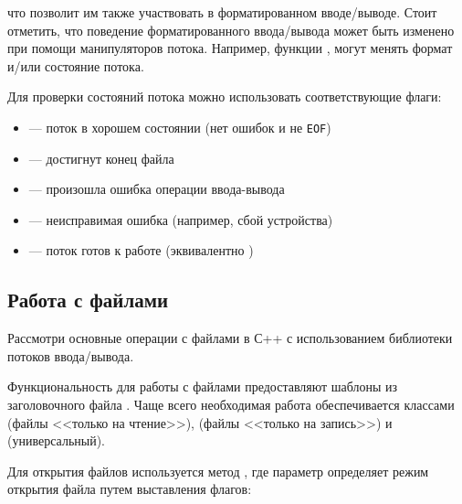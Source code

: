 что позволит им также участвовать в форматированном вводе/выводе. Стоит отметить, что поведение форматированного ввода/вывода может быть изменено
при помощи манипуляторов потока. Например, функции ,  могут менять формат и/или состояние потока.

Для проверки состояний потока можно использовать соответствующие флаги:
\begin{itemize}
    \item {} — поток в хорошем состоянии (нет ошибок и не \verb|EOF|)
    \item {} — достигнут конец файла
    \item {} — произошла ошибка операции ввода-вывода
    \item {} — неисправимая ошибка (например, сбой устройства)
    \item {} — поток готов к работе (эквивалентно )
\end{itemize}

\subsection{Работа с файлами}
Рассмотри основные операции с файлами в С++ с использованием библиотеки потоков ввода/вывода.

Функциональность для работы с файлами предоставляют шаблоны из заголовочного файла . Чаще всего необходимая работа обеспечивается
классами  (файлы <<только на чтение>>),  (файлы <<только на запись>>) и  (универсальный).

Для открытия файлов используется метод , где параметр  определяет режим открытия файла путем
выставления флагов:


